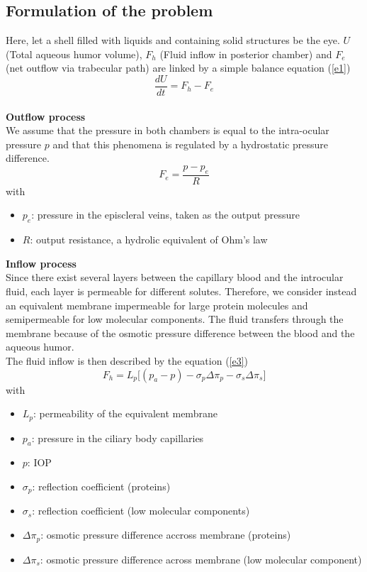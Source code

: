 \documentclass[english,12pt]{article}
\begin{document}
\subsection{Formulation of the problem}
 Here, let a shell filled with liquids and containing solid structures be the eye. $U$ (Total aqueous humor volume), $F_h$ (Fluid inflow in posterior chamber) and $F_e$ (net outflow via trabecular path) are linked by a simple balance equation (\ref{e1})
\begin{equation}
\frac{dU}{dt}=F_{h}-F_{e}
\label{e1}
\end{equation}
\\
\textbf{Outflow process}\\
We assume that the pressure in both chambers is equal to the intra-ocular pressure $p$ and that this phenomena is regulated by a hydrostatic pressure difference.
\begin{equation}
F_{e}= \frac{p-p_{e}}{R}
\label{e2}
\end{equation}
with
\begin{itemize}
\item $p_e$: pressure in the episcleral veins, taken as the output pressure
\item $R$: output resistance, a hydrolic equivalent of Ohm's law
\end{itemize}
\textbf{Inflow process}\\
Since there exist several layers between the capillary blood and the introcular fluid, each layer is permeable for different solutes. Therefore, we consider instead an equivalent membrane impermeable for large protein molecules and semipermeable for low molecular components. The fluid transfers through the membrane because of the osmotic pressure difference between the blood and the aqueous humor.\\
The fluid inflow is then described by the equation (\ref{e3})
\begin{equation}
F_{h}= L_p \big[ (p_a-p)-\sigma_{p} \Delta\pi_{p}-\sigma_{s} \Delta\pi_{s}\big]
\label{e3}
\end{equation}
with
\begin{itemize}
\item $L_p$: permeability of the equivalent membrane
\item $p_a$: pressure in the ciliary body capillaries
\item $p$: IOP
\item $\sigma_p$: reflection coefficient (proteins)
\item $\sigma_s$: reflection coefficient (low molecular components)
\item $\Delta \pi_p $: osmotic pressure difference accross membrane (proteins)
\item $\Delta \pi_s $: osmotic pressure difference across membrane (low molecular component)
\end{itemize}
\end{document}
